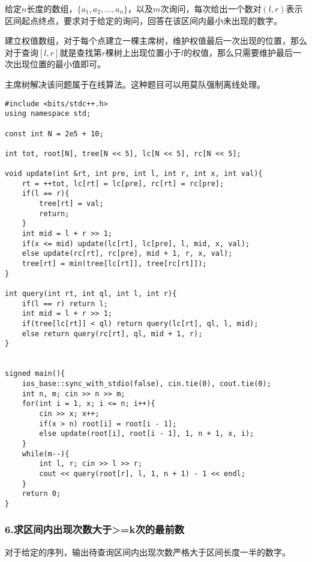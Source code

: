\documentclass[]{article}
\begin{document}
给定\(n\)长度的数组，\(\{a_1, a_2,...,a_n\}\)，以及\(m\)次询问，每次给出一个数对\((l, r)\)表示区间起点终点，要求对于给定的询问，回答在该区间内最小未出现的数字。

建立权值数组，对于每个点建立一棵主席树，维护权值最后一次出现的位置，那么对于查询\([l, r]\)就是查找第\(r\)棵树上出现位置小于\(l\)的权值，那么只需要维护最后一次出现位置的最小值即可。

主席树解决该问题属于在线算法。这种题目可以用莫队强制离线处理。

\begin{verbatim}
#include <bits/stdc++.h>
using namespace std;

const int N = 2e5 + 10;

int tot, root[N], tree[N << 5], lc[N << 5], rc[N << 5];

void update(int &rt, int pre, int l, int r, int x, int val){
    rt = ++tot, lc[rt] = lc[pre], rc[rt] = rc[pre];
    if(l == r){
        tree[rt] = val; 
        return;
    }
    int mid = l + r >> 1;
    if(x <= mid) update(lc[rt], lc[pre], l, mid, x, val);
    else update(rc[rt], rc[pre], mid + 1, r, x, val);
    tree[rt] = min(tree[lc[rt]], tree[rc[rt]]);
}

int query(int rt, int ql, int l, int r){
    if(l == r) return l;
    int mid = l + r >> 1;
    if(tree[lc[rt]] < ql) return query(lc[rt], ql, l, mid);
    else return query(rc[rt], ql, mid + 1, r);
}


signed main(){
    ios_base::sync_with_stdio(false), cin.tie(0), cout.tie(0);
    int n, m; cin >> n >> m;
    for(int i = 1, x; i <= n; i++){
        cin >> x; x++;
        if(x > n) root[i] = root[i - 1];
        else update(root[i], root[i - 1], 1, n + 1, x, i);
    }
    while(m--){
        int l, r; cin >> l >> r;
        cout << query(root[r], l, 1, n + 1) - 1 << endl;
    }
    return 0;
}
\end{verbatim}

\hypertarget{ux6c42ux533aux95f4ux5185ux51faux73b0ux6b21ux6570ux5927ux4e8ekux6b21ux7684ux6700ux524dux6570}{%
\subsubsection{6.求区间内出现次数大于\textgreater=k次的最前数}\label{ux6c42ux533aux95f4ux5185ux51faux73b0ux6b21ux6570ux5927ux4e8ekux6b21ux7684ux6700ux524dux6570}}

对于给定的序列，输出待查询区间内出现次数严格大于区间长度一半的数字。
\end{document}
